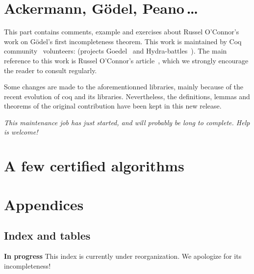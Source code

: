 \documentclass[twoside,a4paper]{book}
\begin{document}
\part{Ackermann, G\"{o}del, Peano\,\dots}
This part contains comments, example  and exercises about Russel O'Connor's work on G\"{o}del's first incompleteness theorem.  This work is maintained by Coq community~\cite{CoqCommunity} volunteers: (projects Goedel~\cite{Goedel} and Hydra-battles~\cite{HydraBattles}).
The main reference to this work is  Russel O'Connor's article~\cite{OConnor05}, which we strongly encourage the reader to 
consult regularly.



Some changes are made to the aforementionned libraries, mainly because of the recent evolution of coq and its libraries. Nevertheless, the definitions, lemmas and theorems of the original contribution have been kept in this new release.

\emph{\color{red!80}This maintenance job has just started, and will probably be long to complete. Help is welcome!}







\part{A few  certified algorithms}



\part{Appendices}








\chapter{Index and tables}

{\Large \textbf{In progress} This index is currently under reorganization.  We apologize for its incompleteness! }

\label{gaia-index}
\end{document}
